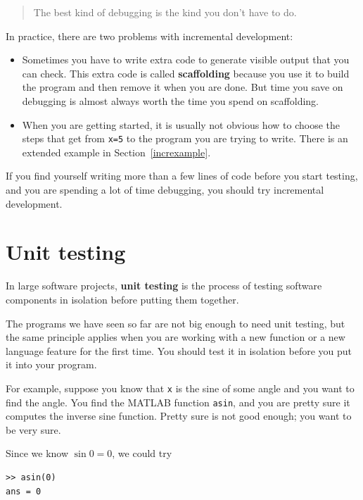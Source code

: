 \documentclass{book}
\begin{document}
\begin{quote}
The best kind of debugging is the kind you don't have to do.
\end{quote}

In practice, there are two problems with incremental development:

\begin{itemize}

\item Sometimes you have to write extra code to
generate visible output that you can check.  This extra code is
called {\bf scaffolding} because you use it to build the program
and then remove it when you are done.  But time you save on
debugging is almost always worth the time you spend on
scaffolding.

\item When you are getting started, it is usually not obvious how to
choose the steps that get from {\tt x=5} to the program you are trying
to write.  There is an extended example in Section~\ref{increxample}.

\end{itemize}

If you find yourself writing more than a few lines of code before
you start testing, and you are spending a lot of time debugging,
you should try incremental development.


\section{Unit testing}

In large software projects, {\bf unit testing} is the process of
testing software components in isolation before putting
them together.

The programs we have seen so far are not
big enough to need unit testing, but the same principle applies
when you are working with a new function or a new language feature
for the first time.  You should test it in isolation before you
put it into your program.

For example, suppose you know that {\tt x} is the sine of some
angle and you want to find the angle.  You find the MATLAB function
{\tt asin}, and you are pretty sure it computes the inverse sine
function.  Pretty sure is not good enough; you want to be very sure.

Since we know $\sin 0 = 0$, we could try

\begin{verbatim}
>> asin(0)
ans = 0
\end{verbatim}
\end{document}
